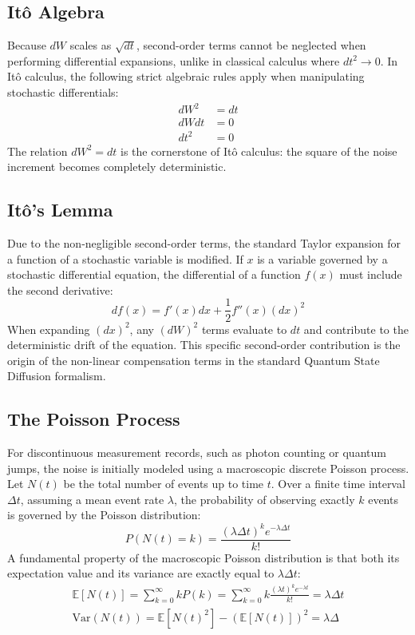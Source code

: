 \documentclass[a4paper,12pt]{article}
\begin{document}
	\subsection{It\^o Algebra}
	
	Because $dW$ scales as $\sqrt{dt}$, second-order terms cannot be neglected when performing differential expansions, unlike in classical calculus where $dt^2 \to 0$. In It\^o calculus, the following strict algebraic rules apply when manipulating stochastic differentials:
	\begin{align}
		dW^2 &= dt \\
		dW dt &= 0 \\
		dt^2 &= 0
	\end{align}
	The relation $dW^2 = dt$ is the cornerstone of It\^o calculus: the square of the noise increment becomes completely deterministic.
	
	\subsection{It\^o's Lemma}
	
	Due to the non-negligible second-order terms, the standard Taylor expansion for a function of a stochastic variable is modified. If $x$ is a variable governed by a stochastic differential equation, the differential of a function $f(x)$ must include the second derivative:
	\begin{equation}
		df(x) = f'(x)dx + \frac{1}{2}f''(x)(dx)^2
	\end{equation}
	When expanding $(dx)^2$, any $(dW)^2$ terms evaluate to $dt$ and contribute to the deterministic drift of the equation. This specific second-order contribution is the origin of the non-linear compensation terms in the standard Quantum State Diffusion formalism.
	
	\subsection{The Poisson Process}
	
	For discontinuous measurement records, such as photon counting or quantum jumps, the noise is initially modeled using a macroscopic discrete Poisson process. Let $N(t)$ be the total number of events up to time $t$. Over a finite time interval $\Delta t$, assuming a mean event rate $\lambda$, the probability of observing exactly $k$ events is governed by the Poisson distribution:
	\begin{equation}
		P(N(t)=k) = \frac{(\lambda \Delta t)^k e^{-\lambda \Delta t}}{k!}
	\end{equation}
	A fundamental property of the macroscopic Poisson distribution is that both its expectation value and its variance are exactly equal to $\lambda \Delta t$:
	\begin{align}
		\mathbb{E}[N(t)] = \sum_{k=0}^{\infty} k P(k) = \sum_{k=0}^{\infty} k  \frac{(\lambda t)^k e^{-\lambda t}}{k!} = \lambda \Delta t \\
		\text{Var}(N(t)) = \mathbb{E}[N(t)^2] - (\mathbb{E}[N(t)])^2 = \lambda \Delta 
	\end{align}
	
\end{document}
